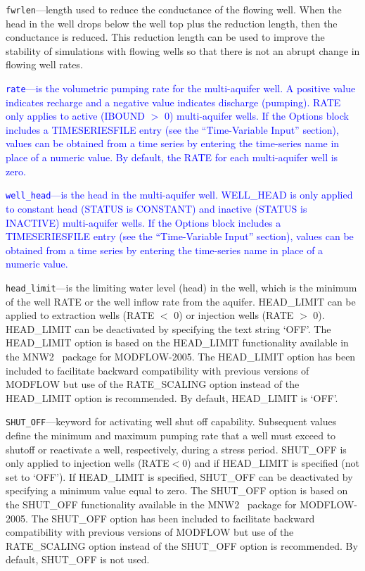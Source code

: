\begin{description}
\item \texttt{fwrlen}---length used to reduce the conductance of the flowing well.  When the head in the well drops below the well top plus the reduction length, then the conductance is reduced.  This reduction length can be used to improve the stability of simulations with flowing wells so that there is not an abrupt change in flowing well rates.

\item \textcolor{blue}{\texttt{rate}---is the volumetric pumping rate for the multi-aquifer well. A positive value indicates recharge and a negative value indicates discharge (pumping). RATE only applies to active (IBOUND $>$ 0) multi-aquifer wells. If the Options block includes a TIMESERIESFILE entry (see the ``Time-Variable Input'' section), values can be obtained from a time series by entering the time-series name in place of a numeric value. By default, the RATE for each multi-aquifer well is zero.}

\item \textcolor{blue}{\texttt{well\_head}---is the head in the multi-aquifer well. WELL\_HEAD is only applied to constant head (STATUS is CONSTANT) and inactive (STATUS is INACTIVE) multi-aquifer wells. If the Options block includes a TIMESERIESFILE entry (see the ``Time-Variable Input'' section), values can be obtained from a time series by entering the time-series name in place of a numeric value.}

\item \texttt{head\_limit}---is the limiting water level (head) in the well, which is the minimum of the well RATE or the well inflow rate from the aquifer. HEAD\_LIMIT can be applied to extraction wells (RATE $<$ 0) or injection wells (RATE $>$ 0). HEAD\_LIMIT can be deactivated by specifying the text string `OFF'. The HEAD\_LIMIT option is based on the HEAD\_LIMIT functionality available in the MNW2~\citep{konikow2009} package for MODFLOW-2005. The HEAD\_LIMIT option has been included to facilitate backward compatibility with previous versions of MODFLOW but use of the RATE\_SCALING option instead of the HEAD\_LIMIT option is recommended. By default, HEAD\_LIMIT is `OFF'.

\item \texttt{SHUT\_OFF}---keyword for activating well shut off capability.  Subsequent values define the minimum and maximum pumping rate that a well must exceed to shutoff or reactivate a well, respectively, during a stress period. SHUT\_OFF is only applied to injection wells (RATE$<0$) and if HEAD\_LIMIT is specified (not set to `OFF').  If HEAD\_LIMIT is specified, SHUT\_OFF can be deactivated by specifying a minimum value equal to zero. The SHUT\_OFF option is based on the SHUT\_OFF functionality available in the MNW2~\citep{konikow2009} package for MODFLOW-2005. The SHUT\_OFF option has been included to facilitate backward compatibility with previous versions of MODFLOW but use of the RATE\_SCALING option instead of the SHUT\_OFF option is recommended. By default, SHUT\_OFF is not used.


\end{description}
